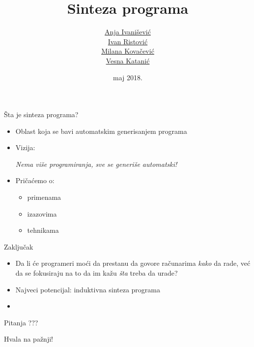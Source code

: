 \documentclass{beamer}
\title{Sinteza programa}
\author{ \href{mailto:anja.ivanisevic95@gmail.com}{Anja Ivanišević}\\ \href{mailto:mi14031@matf.bg.ac.rs}{Ivan Ristović}\\ \href{mailto:mi14042@matf.bg.ac.rs}{Milana Kovačević}\\ \href{mailto:vesna.katanic@gmail.com}{Vesna Katanić}}
\date{maj 2018.}
\begin{document}
\begin{frame}
    \titlepage
\end{frame}

\begin{frame}{\v{S}ta je sinteza programa?}
    \begin{itemize}
        \item Oblast koja se bavi automatskim generisanjem programa
        \item Vizija:\\
            \begin{center}
            \emph{Nema vi\v{s}e programiranja, sve se generi\v{s}e automatski!}
            \end{center}
        \item Pri\v{c}a\'{c}emo o:
        \begin{itemize}
            \item primenama
            \item izazovima
            \item tehnikama
        \end{itemize}
    \end{itemize}
\end{frame}








\begin{frame}{Zaključak}
    \centering
    \begin{itemize}
        \item Da li će programeri moći da prestanu da govore računarima \emph{kako} da rade, već da se fokusiraju na to da im kažu \emph{šta} treba da urade?
        \item Najveci potencijal: induktivna sinteza programa
        \item
    \end{itemize}
\end{frame}


\begin{frame}{Pitanja}
    \centering
    ???
\end{frame}

\begin{frame}{}
    \centering
    Hvala na pažnji!
\end{frame}
\end{document}
